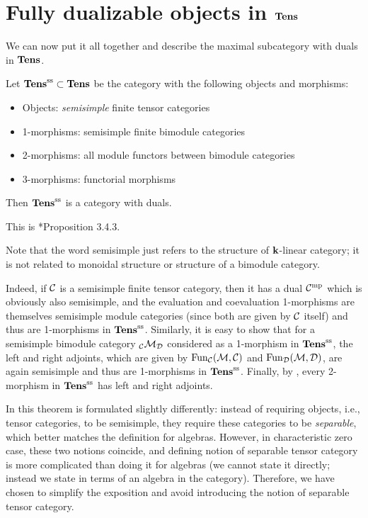 \section{Fully dualizable objects in $\mathbf{Tens}$}\label{s:tens-dualizable}
We can now put it all together and describe the maximal subcategory with duals
in $\mathbf{Tens}$.

\begin{theorem}\label{t:tens-dualizable}
  Let $\mathbf{Tens}^{\mathrm{ss}}\subset \mathbf{Tens}$ be the category with the following objects and
  morphisms:
  \begin{itemize}
    \item Objects: \emph{semisimple} finite tensor categories
    \item 1-morphisms: semisimple finite bimodule categories
    \item 2-morphisms: all module functors between bimodule categories
    \item 3-morphisms: functorial morphisms
  \end{itemize}
  Then $\mathbf{Tens}^{\mathrm{ss}}$ is a category with duals.
\end{theorem}
This is *{Proposition 3.4.3}.

Note that the word semisimple just refers to the structure of $\mathbf{k}$-linear
category; it is not related to monoidal structure or structure of a bimodule
category.

Indeed, if $\mathcal{C}$ is a semisimple finite tensor category, then it has a dual
$\mathcal{C}^{\mathrm{mp}}$ which is obviously also semisimple, and the evaluation and
coevaluation 1-morphisms are themselves semisimple module categories (since both
are given by $\mathcal{C}$ itself) and thus are 1-morphisms in $\mathbf{Tens}^{\mathrm{ss}}$.
Similarly, it is easy to show that for a semisimple bimodule category
${}_{\mathcal{C}}\mathcal{M}_{\mathcal{D}}$ considered as a 1-morphism in $\mathbf{Tens}^{\mathrm{ss}}$, the left and
right adjoints, which are given by $\operatorname{Fun}_{\mathcal{C}}(\mathcal{M}, \mathcal{C})$ and
$\operatorname{Fun}_{\mathcal{D}}(\mathcal{M}, \mathcal{D})$, are again semisimple and thus are 1-morphisms in
$\mathbf{Tens}^{\mathrm{ss}}$. Finally, by , every 2-morphism in
$\mathbf{Tens}^{\mathrm{ss}}$ has left and right adjoints.


\begin{remark}
  In  this theorem is formulated slightly differently:
  instead of requiring objects, i.e., tensor categories, to be semisimple, they
  require these categories to be \emph{separable}, which better matches the definition for algebras.
  However, in characteristic zero case, these two notions coincide, and defining
  notion of separable tensor category is more complicated than doing it for
  algebras (we cannot state it directly; instead we state in terms of an algebra
  in the category). Therefore, we have chosen to simplify the exposition and
  avoid introducing the notion of separable tensor category.
\end{remark}

